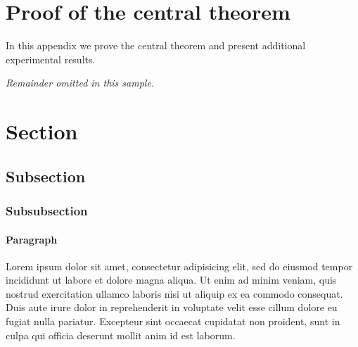 \documentclass[twoside,11pt]{article}
\begin{document}





\clearpage
\appendix
\section{Proof of the central theorem}
	In this appendix we prove the central theorem and present additional experimental results.
	\noindent


	{\noindent \em Remainder omitted in this sample. }

\section{Section}
	\subsection{Subsection}
		\subsubsection{Subsubsection}
			\paragraph{Paragraph} Lorem ipsum dolor sit amet, consectetur adipisicing elit, sed do eiusmod
			tempor incididunt ut labore et dolore magna aliqua. Ut enim ad minim veniam,
			quis nostrud exercitation ullamco laboris nisi ut aliquip ex ea commodo
			consequat. Duis aute irure dolor in reprehenderit in voluptate velit esse
			cillum dolore eu fugiat nulla pariatur. Excepteur sint occaecat cupidatat non
			proident, sunt in culpa qui officia deserunt mollit anim id est laborum.
\end{document}
